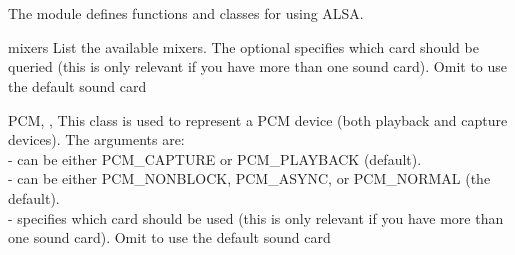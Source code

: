\section{}







The  module defines functions and classes for using
ALSA.


\begin{funcdesc}{mixers}{}
List the available mixers. The optional  specifies which
card should be queried (this is only relevant if you have more than one
sound card). Omit to use the default sound card
\end{funcdesc}

\begin{classdesc}{PCM}{, , }
This class is used to represent a PCM device (both playback and capture devices).
The arguments are: \\
 - can be either PCM_CAPTURE or PCM_PLAYBACK (default). \\
 - can be either PCM_NONBLOCK, PCM_ASYNC, or PCM_NORMAL (the default).\\
 - specifies which card should be used (this is only relevant 
if you have more than one sound card). Omit to use the default sound card
\end{classdesc}

